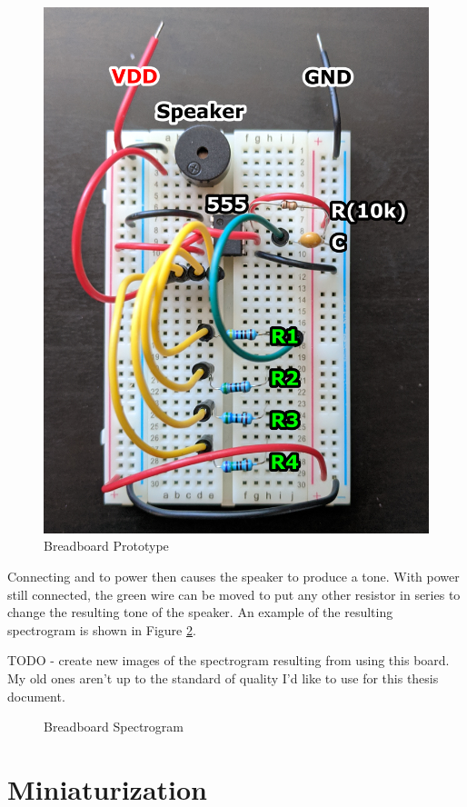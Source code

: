 \begin{figure}[h]
    \centering
    \caption{Breadboard Prototype}
    \label{fig:breadboard}
    \includegraphics[width=.8\linewidth]{Figures/6 PCB Design/breadboard.png}
\end{figure}

Connecting  and  to power then causes the speaker
to produce a tone. With power still connected, the green wire can be
moved to put any other resistor in series to change the resulting tone
of the speaker. An example of the resulting spectrogram is shown in
Figure \ref{fig:breadboard-spectrogram}.

TODO - create new images of the spectrogram resulting from using this
board. My old ones aren't up to the standard of quality I'd like to use
for this thesis document.

\begin{figure}[h]
    \centering
    \caption{Breadboard Spectrogram}
    \label{fig:breadboard-spectrogram}
\end{figure}

\newpage
\section{Miniaturization}

